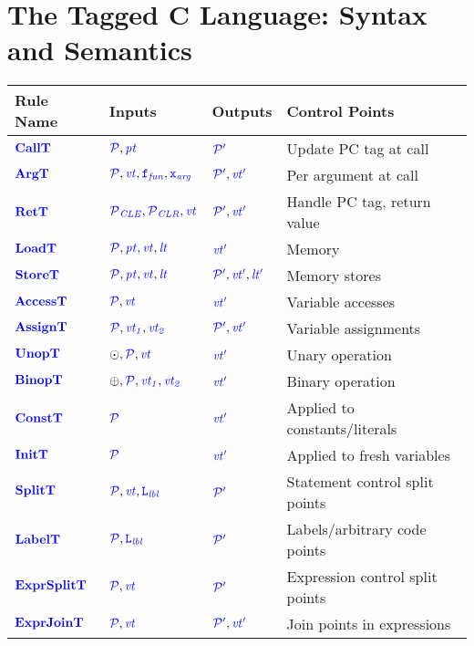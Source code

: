 \section{The Tagged C Language: Syntax and Semantics}
\label{ch4:sec:language}
\begin{table}[t]
\begin{center}
  \begin{tabular}{|l|l|l|l|}
    \hline
    Rule Name & Inputs & Outputs & Control Points \\
    \hline
    \(\calltname\)      & \(\calltargs\)         & \(\calltres\)      & Update PC tag at call \\
    \(\argtname\)       & \(\argtargs\)          & \(\argtres\)       & Per argument at call \\
    \(\rettname\)       & \(\rettargs\)          & \(\rettres\)       & Handle PC tag, return value \\
    \(\loadtname\)      & \(\loadtargs\)         & \(\loadtres\)      & Memory  \\
    \(\storetname\)     & \(\storetargs\)        & \(\storetres\)     & Memory stores \\
    \(\accesstname\)    & \(\accesstargs\)       & \(\accesstres\)    & Variable accesses \\
    \(\assigntname\)    & \(\assigntargs\)       & \(\assigntres\)    & Variable assignments \\
    \(\unoptname\)      & \(\unoptargs\)         & \(\unoptres\)      & Unary operation \\
    \(\binoptname\)     & \(\binoptargs\)        & \(\binoptres\)     & Binary operation \\
    \(\consttname\)     & \(\consttargs\)        & \(\consttres\)     & Applied to constants/literals \\
    \(\inittname\)      & \(\inittargs\)         & \(\inittres\)      & Applied to fresh variables \\
    \(\splittname\)     & \(\splittargs\)        & \(\splittres\)     & Statement control split points \\
    \(\labeltname\)     & \(\labeltargs\)        & \(\labeltres\)     & Labels/arbitrary code points \\
    \(\exprsplittname\) & \(\exprsplittargs\)    & \(\exprsplittres\) & Expression control split points \\
    \(\exprjointname\)  & \(\exprjointargs\)     & \(\exprjointres\)  & Join points in expressions \\

\end{tabular}
\end{center}
\end{table}
